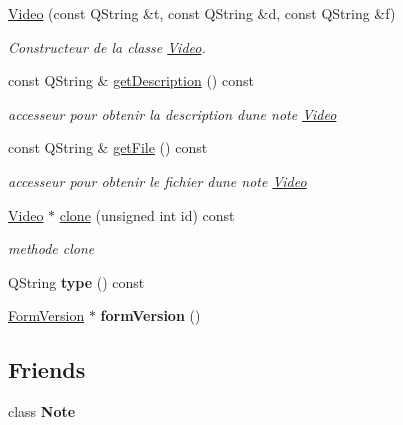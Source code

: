 \begin{DoxyCompactItemize}
\item 
\hyperlink{class_video_a4a902371a9cf3d9d2c6300f181745646}{Video} (const Q\+String \&t, const Q\+String \&d, const Q\+String \&f)
\begin{DoxyCompactList}\small\item\em Constructeur de la classe \hyperlink{class_video}{Video}. \end{DoxyCompactList}\item 
\mbox{\label{class_video_a7f921dc22bb8b7c4fd6551cd6d61a957}} 
const Q\+String \& \hyperlink{class_video_a7f921dc22bb8b7c4fd6551cd6d61a957}{get\+Description} () const
\begin{DoxyCompactList}\small\item\em accesseur pour obtenir la description d\textquotesingle{}une note \hyperlink{class_video}{Video} \end{DoxyCompactList}\item 
\mbox{\label{class_video_af2019c98a6abc6bd6334137155c9b06d}} 
const Q\+String \& \hyperlink{class_video_af2019c98a6abc6bd6334137155c9b06d}{get\+File} () const
\begin{DoxyCompactList}\small\item\em accesseur pour obtenir le fichier d\textquotesingle{}une note \hyperlink{class_video}{Video} \end{DoxyCompactList}\item 
\hyperlink{class_video}{Video} $\ast$ \hyperlink{class_video_a505ceb0063f73cf8dd06bc6c6ff72c5d}{clone} (unsigned int id) const
\begin{DoxyCompactList}\small\item\em methode clone \end{DoxyCompactList}\item 
\mbox{\label{class_video_a0fa52bee53c7b9c860cf4a9db34ea512}} 
Q\+String {\bfseries type} () const
\item 
\mbox{\label{class_video_a8ee5b9f6239ba930dd6445e01100336f}} 
\hyperlink{class_form_version}{Form\+Version} $\ast$ {\bfseries form\+Version} ()
\end{DoxyCompactItemize}
\subsection*{Friends}
\begin{DoxyCompactItemize}
\item 
\mbox{\label{class_video_a93d7e72623acdfa5b079a11fbf2d9f9d}} 
class {\bfseries Note}
\end{DoxyCompactItemize}
